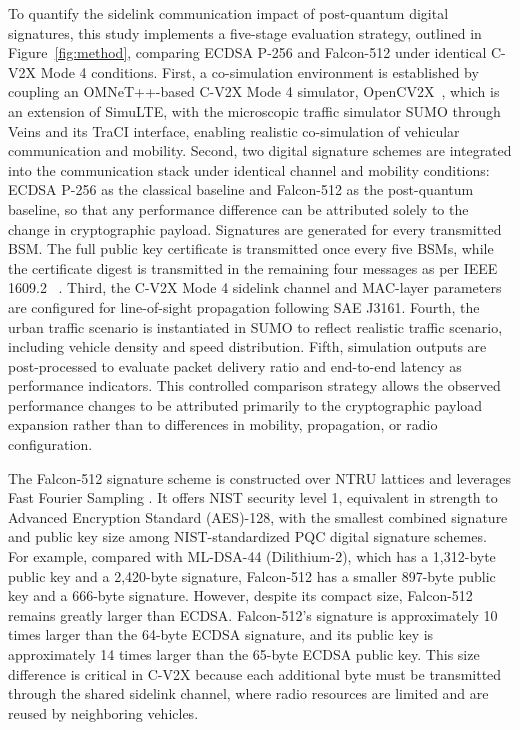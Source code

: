\documentclass[conference]{IEEEtran}
\begin{document}
To quantify the sidelink communication impact of post-quantum digital signatures, this study implements a five-stage evaluation strategy, outlined in Figure~\ref{fig:method}, comparing ECDSA P-256 and Falcon-512 under identical C-V2X Mode 4 conditions. First, a co-simulation environment is established by coupling an OMNeT++-based C-V2X Mode 4 simulator, OpenCV2X~\cite{opencv2x}, which is an extension of SimuLTE\cite{virdis2014simulte}, with the microscopic traffic simulator SUMO through Veins and its TraCI interface, enabling realistic co-simulation of vehicular communication and mobility. Second, two digital signature schemes are integrated into the communication stack under identical channel and mobility conditions: ECDSA P-256 as the classical baseline and Falcon-512 as the post-quantum baseline, so that any performance difference can be attributed solely to the change in cryptographic payload. Signatures are generated for every transmitted BSM. The full public key certificate is transmitted once every five BSMs, while the certificate digest is transmitted in the remaining four messages as per IEEE 1609.2 ~\cite{ieee_16092}. Third, the C-V2X Mode 4 sidelink channel and MAC-layer parameters are configured for line-of-sight propagation following SAE J3161. Fourth, the urban traffic scenario is instantiated in SUMO to reflect realistic traffic scenario, including vehicle density and speed distribution. Fifth, simulation outputs are post-processed to evaluate packet delivery ratio and end-to-end latency as performance indicators. This controlled comparison strategy allows the observed performance changes to be attributed primarily to the cryptographic payload expansion rather than to differences in mobility, propagation, or radio configuration.

The Falcon-512 signature scheme is constructed over NTRU lattices and leverages Fast Fourier Sampling \cite{fouque2017falcon}. It offers NIST security level 1, equivalent in strength to Advanced Encryption Standard (AES)-128, with the smallest combined signature and public key size among NIST-standardized PQC digital signature schemes. For example, compared with ML-DSA-44 (Dilithium-2), which has a 1,312-byte public key and a 2,420-byte signature, Falcon-512 has a smaller 897-byte public key and a 666-byte signature. However, despite its compact size, Falcon-512 remains greatly larger than ECDSA. Falcon-512's signature is approximately 10 times larger than the 64-byte ECDSA signature, and its public key is approximately 14 times larger than the 65-byte ECDSA public key. This size difference is critical in C-V2X because each additional byte must be transmitted through the shared sidelink channel, where radio resources are limited and are reused by neighboring vehicles.
\end{document}
